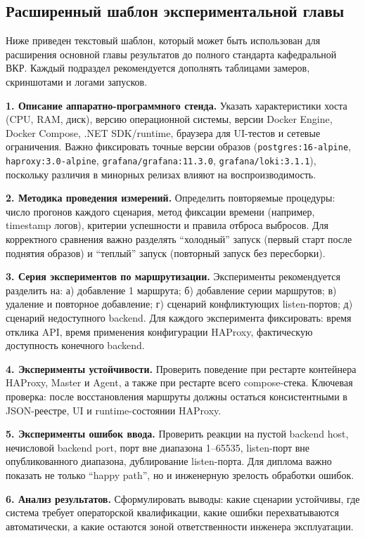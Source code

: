 \subsection{Расширенный шаблон экспериментальной главы}

Ниже приведен текстовый шаблон, который может быть использован для расширения основной главы результатов до полного стандарта кафедральной ВКР. Каждый подраздел рекомендуется дополнять таблицами замеров, скриншотами и логами запусков.

\textbf{1. Описание аппаратно-программного стенда.}
Указать характеристики хоста (CPU, RAM, диск), версию операционной системы, версии Docker Engine, Docker Compose, .NET SDK/runtime, браузера для UI-тестов и сетевые ограничения. Важно фиксировать точные версии образов (\texttt{postgres:16-alpine}, \texttt{haproxy:3.0-alpine}, \texttt{grafana/grafana:11.3.0}, \texttt{grafana/loki:3.1.1}), поскольку различия в минорных релизах влияют на воспроизводимость.

\textbf{2. Методика проведения измерений.}
Определить повторяемые процедуры: число прогонов каждого сценария, метод фиксации времени (например, timestamp логов), критерии успешности и правила отброса выбросов. Для корректного сравнения важно разделять ``холодный'' запуск (первый старт после поднятия образов) и ``теплый'' запуск (повторный запуск без пересборки).

\textbf{3. Серия экспериментов по маршрутизации.}
Эксперименты рекомендуется разделить на: а) добавление 1 маршрута; б) добавление серии маршрутов; в) удаление и повторное добавление; г) сценарий конфликтующих listen-портов; д) сценарий недоступного backend. Для каждого эксперимента фиксировать: время отклика API, время применения конфигурации HAProxy, фактическую доступность конечного backend.

\textbf{4. Эксперименты устойчивости.}
Проверить поведение при рестарте контейнера HAProxy, Master и Agent, а также при рестарте всего compose-стека. Ключевая проверка: после восстановления маршруты должны остаться консистентными в JSON-реестре, UI и runtime-состоянии HAProxy.

\textbf{5. Эксперименты ошибок ввода.}
Проверить реакции на пустой backend host, нечисловой backend port, порт вне диапазона 1--65535, listen-порт вне опубликованного диапазона, дублирование listen-порта. Для диплома важно показать не только ``happy path'', но и инженерную зрелость обработки ошибок.

\textbf{6. Анализ результатов.}
Сформулировать выводы: какие сценарии устойчивы, где система требует операторской квалификации, какие ошибки перехватываются автоматически, а какие остаются зоной ответственности инженера эксплуатации.

